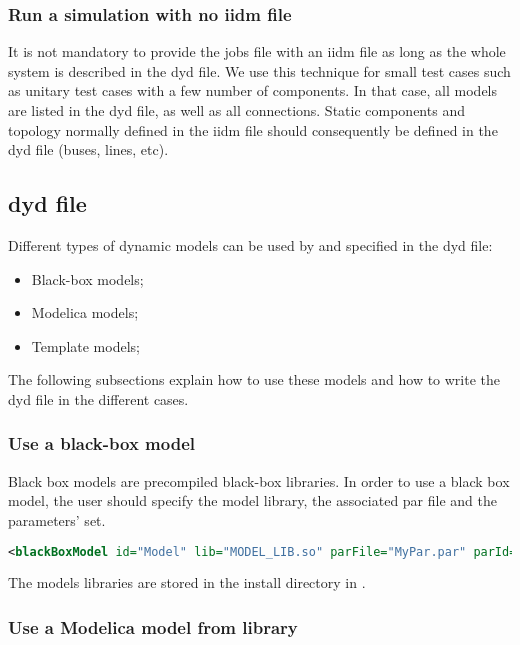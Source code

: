 \documentclass[a4paper, 12pt]{report}
\begin{document}
\subsubsection{Run a simulation with no iidm file}
\label{sec:Run a simulation with no iidm file}

It is not mandatory to provide the jobs file with an iidm file as long as the whole system is described in the dyd file.
We use this technique for small test cases such as unitary test cases with a few number of components.
In that case, all models are listed in the dyd file, as well as all connections.
Static components and topology normally defined in the iidm file should consequently be defined in the dyd file (buses, lines, etc).


\subsection{dyd file}

Different types of dynamic models can be used by \Dynawo and specified in the dyd file:
\begin{itemize}
\item Black-box models;
\item Modelica models;
\item Template models;
\end{itemize}

The following subsections explain how to use these models and how to write the dyd file in the different cases.

\subsubsection{Use a black-box model}

Black box models are precompiled black-box libraries. In order to use a black box model, the user should specify the model library, the associated par file and the parameters' set.
\begin{lstlisting}[language=XML, morekeywords={lib},numbers=none]
<blackBoxModel id="Model" lib="MODEL_LIB.so" parFile="MyPar.par" parId="5">
\end{lstlisting}

The models libraries are stored in the install directory in .

\subsubsection[Use a Modelica model from Dynawo library]{Use a Modelica model from \Dynawo library}
\end{document}
